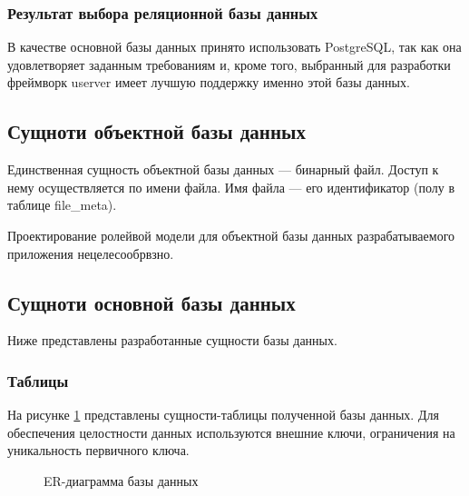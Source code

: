 \subsubsection{Результат выбора реляционной базы данных}

В качестве основной базы данных принято использовать PostgreSQL, так как она удовлетворяет заданным требованиям и, кроме того, выбранный для разработки фреймворк userver имеет лучшую поддержку именно этой базы данных.

\subsection{Сущноти объектной базы данных}

Единственная сущность объектной базы данных --- бинарный файл. Доступ к нему осуществляется по имени файла. Имя файла --- его идентификатор (полу в таблице file{\_}meta).

Проектирование ролейвой модели для объектной базы данных разрабатываемого приложения нецелесообрвзно.

\subsection{Сущноти основной базы данных}

Ниже представлены разработанные сущности базы данных.

\subsubsection{Таблицы}

На рисунке \ref{fig:dr-er} представлены сущности-таблицы полученной базы данных. Для обеспечения целостности данных используются внешние ключи, ограничения на уникальность первичного ключа.

\begin{figure}[h!]
	\caption{ER-диаграмма базы данных}
	\label{fig:dr-er}
\end{figure}

